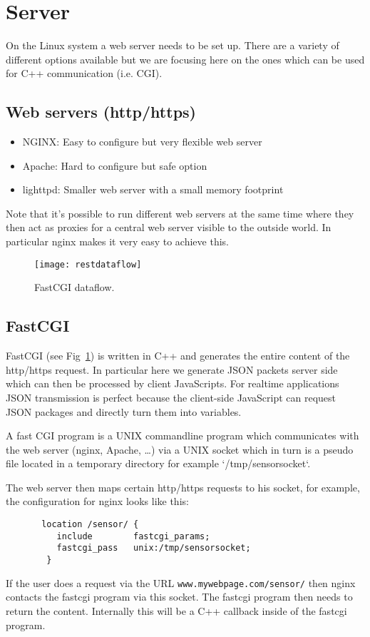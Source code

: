 \documentclass[12pt]{report}
\begin{document}
\section{Server}
On the Linux system a web server needs to be set up. There are
a variety of different options available but we are focusing here
on the ones which can be used for C++ communication (i.e. CGI).

\subsection{Web servers (http/https)}

\begin{itemize}
  \item NGINX: Easy to configure but very flexible web server
  \item Apache: Hard to configure but safe option
  \item lighttpd: Smaller web server with a small memory footprint
\end{itemize}
Note that it's possible to run different web servers at the
same time where they then act as proxies for a central web
server visible to the outside world. In particular nginx
makes it very easy to achieve this.

\begin{figure}[h]
\begin{center}
\texttt{[image: restdataflow]}
\end{center}
\caption{FastCGI dataflow.\label{cgi}}
\end{figure}

\subsection{FastCGI}
FastCGI (see Fig~\ref{cgi}) is written in C++ and generates the entire
content of the http/https request. In particular here we generate
JSON packets server side which can then be processed by client JavaScripts.
For realtime applications JSON transmission is perfect because the client-side
JavaScript can request JSON packages and directly turn them into variables.

A fast CGI program is a UNIX commandline program which communicates with the web server
(nginx, Apache, \ldots) via a UNIX socket which in turn is a pseudo file located
in a temporary directory for example `/tmp/sensorsocket`.

The web server then maps certain http/https requests to
his socket, for example, the configuration for nginx looks like this:
\begin{verbatim}
       location /sensor/ {
          include        fastcgi_params;
          fastcgi_pass   unix:/tmp/sensorsocket;
        }
\end{verbatim}
If the user does a request via the URL \texttt{www.mywebpage.com/sensor/} then
nginx contacts the fastcgi program via this socket. The fastcgi program
then needs to return the content. Internally this will be a C++ callback
inside of the fastcgi program.
\end{document}

